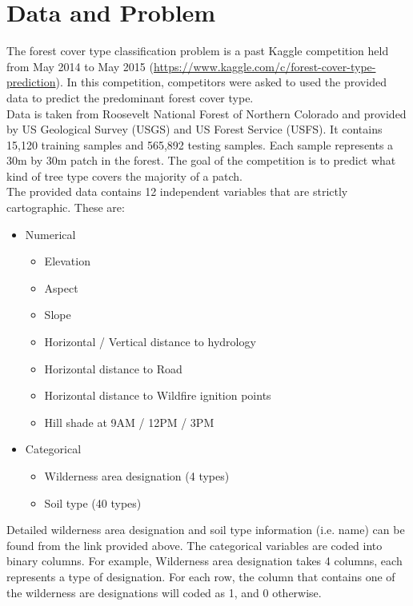 \documentclass[11pt]{article}
\begin{document}
\tableofcontents
\thispagestyle{empty}
\cleardoublepage


\newpage
\setcounter{page}{1}


\singlespace

\section{Data and Problem}

The forest cover type classification problem is a past Kaggle competition held from May 2014 to May 2015 (\href{https://www.kaggle.com/c/forest-cover-type-prediction}{https://www.kaggle.com/c/forest-cover-type-prediction}). In this competition, competitors were asked to used the provided data to predict the predominant forest cover type. \\

\noindent Data is taken from Roosevelt National Forest of Northern Colorado and provided by US Geological Survey (USGS) and US Forest Service (USFS). It contains 15,120 training samples and 565,892 testing samples. Each sample represents a 30m by 30m patch in the forest. The goal of the competition is to predict what kind of tree type covers the majority of a patch. \\

\noindent The provided data contains 12 independent variables that are strictly cartographic. These are:
\begin{itemize}
\setlength\itemsep{0cm}
\item Numerical
\begin{itemize}
\setlength\itemsep{0cm}
\item Elevation
\item Aspect
\item Slope
\item Horizontal / Vertical distance to hydrology
\item Horizontal distance to Road
\item Horizontal distance to Wildfire ignition points
\item Hill shade at 9AM / 12PM / 3PM
\end{itemize}
\item Categorical
\begin{itemize}
\setlength\itemsep{0cm}
\item Wilderness area designation (4 types)
\item Soil type (40 types)
\end{itemize}
\end{itemize}
Detailed wilderness area designation and soil type information (i.e. name) can be found from the link provided above. The categorical variables are coded into binary columns. For example, Wilderness area designation takes 4 columns, each represents a type of designation. For each row, the column that contains one of the wilderness are designations will coded as 1, and 0 otherwise.\\
\end{document}

